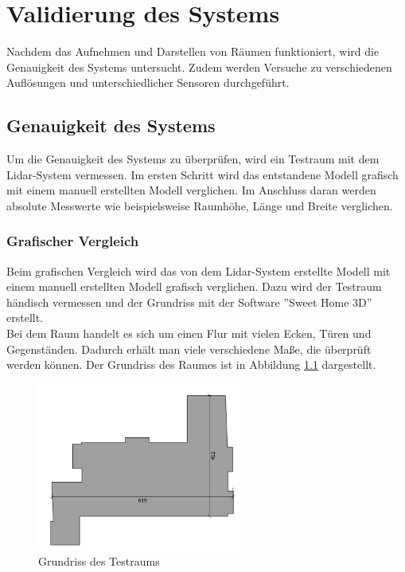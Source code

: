 

\chapter{Validierung des Systems}\label{chap:validierung}

Nachdem das Aufnehmen und Darstellen von Räumen funktioniert, wird die Genauigkeit des Systems untersucht. Zudem werden Versuche zu verschiedenen Auflösungen und unterschiedlicher Sensoren durchgeführt.  


\section{Genauigkeit des Systems}

Um die Genauigkeit des Systems zu überprüfen, wird ein Testraum mit dem Lidar-System vermessen. Im ersten Schritt wird das entstandene Modell grafisch mit einem manuell erstellten Modell verglichen.
Im Anschluss daran werden absolute Messwerte wie beispielsweise Raumhöhe, Länge und Breite verglichen.

	
\subsection{Grafischer Vergleich}

Beim grafischen Vergleich wird das von dem Lidar-System erstellte Modell mit einem manuell erstellten Modell grafisch verglichen.
Dazu wird der Testraum händisch vermessen und der Grundriss mit der Software ''Sweet Home 3D'' erstellt. \\
Bei dem Raum handelt es sich um einen Flur mit vielen Ecken, Türen und Gegenständen. Dadurch erhält man viele verschiedene Maße, die überprüft werden können. Der Grundriss des Raumes ist in Abbildung \ref{grundriss} dargestellt. 

\begin{figure}[H]
	\centering
	\includegraphics[width=0.6\textwidth]{images/Validierung/Grundriss}
	\caption{Grundriss des Testraums}
	\label{grundriss}
\end{figure}


